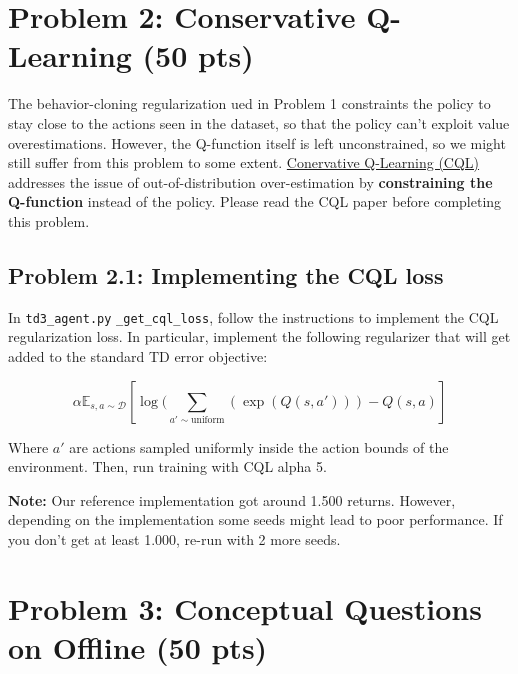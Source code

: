 \documentclass[12pt]{article}
\begin{document}
\begin{solution}[height=5cm]
\end{solution}




\newpage


\section*{Problem 2: Conservative Q-Learning (50 pts)}

The behavior-cloning regularization ued in Problem 1 constraints the policy to stay close to the actions seen in the dataset, so that the policy can't exploit value overestimations. However, the Q-function itself is left unconstrained, so we might still suffer from this problem to some extent. \href{https://arxiv.org/abs/2006.04779}{Conervative Q-Learning (CQL)} addresses the issue of out-of-distribution over-estimation by \textbf{constraining the Q-function} instead of the policy. Please read the CQL paper before completing this problem.

\subsection*{Problem 2.1: Implementing the CQL loss}

In \texttt{td3_agent.py} \texttt{_get_cql_loss}, follow the instructions to implement the CQL regularization loss. In particular, implement the following regularizer that will get added to the standard TD error objective:

\begin{equation}
    \alpha \mathbb{E}_{s, a \sim \mathcal{D}} \left[\log (\sum_{a' \sim \text{uniform}} (\exp(Q(s, a'))) - Q(s, a) \right]
\end{equation}

Where $a'$ are actions sampled uniformly inside the action bounds of the environment.
Then, run training with CQL alpha 5.

\textbf{Note:} Our reference implementation got around 1.500 returns. However, depending on the implementation some seeds might lead to poor performance. If you don't get at least 1.000, re-run with 2 more seeds.

\begin{solution}[height=5cm]
\end{solution}


\newpage
\section*{Problem 3: Conceptual Questions on Offline  (50 pts)}
\end{document}
